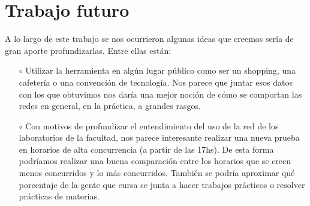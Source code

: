 \section{Trabajo futuro}

A lo largo de este trabajo se nos ocurrieron algunas ideas que creemos ser\'ia de gran aporte profundizarlas. Entre ellas est\'an:

\begin{itemize}
\item[$\circ$]Utilizar la herramienta en alg\'un lugar p\'ublico como ser un shopping, una cafeter\'ia o una convenci\'on de tecnolog\'ia. Nos parece que juntar esos datos con los que obtuvimos nos dar\'ia una mejor noci\'on de c\'omo se comportan las redes en general, en la pr\'actica, a grandes rasgos.
\item[$\circ$]Con motivos de profundizar el entendimiento del uso de la red de los laboratorios de la facultad, nos parece interesante realizar una nueva prueba en horarios de alta concurrencia (a partir de las 17hs). De esta forma podr\'iamos realizar una buena comparaci\'on entre los horarios que se creen menos concurridos y lo m\'as concurridos. Tambi\'en se podr\'ia aproximar qu\'e porcentaje de la gente que cursa se junta a hacer trabajos pr\'acticos o resolver pr\'acticas de materias.
\end{itemize}

